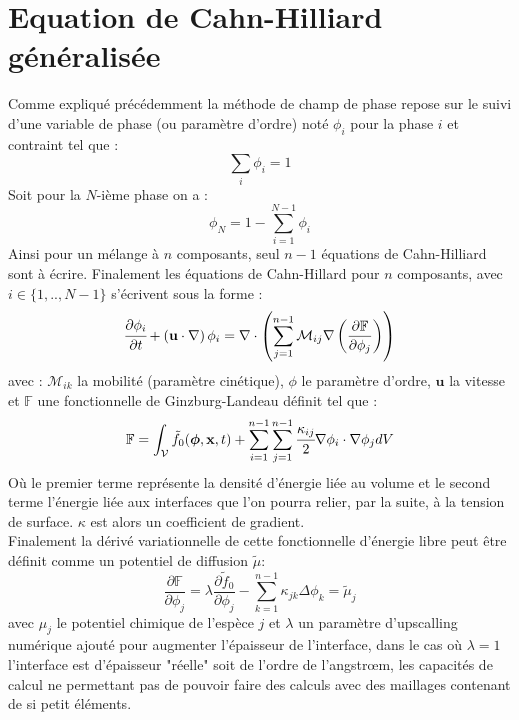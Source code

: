 \documentclass[a4paper,11pt,fleqn]{report}    %
\begin{document}
\section{Equation de Cahn-Hilliard généralisée}
Comme expliqué précédemment la méthode de champ de phase repose sur le suivi d'une variable de phase (ou paramètre d'ordre) noté $\phi_i$ pour la phase $i$ et contraint tel que : 
\begin{equation}
\sum_i \phi_i =1
\end{equation} 
Soit pour la $N$-ième phase on a :
\begin{equation}
\phi_N =1 - \sum_{i=1}^{N-1} \phi_i
\end{equation} 
Ainsi pour un mélange à $n$ composants, seul $n-1$ équations de Cahn-Hilliard sont à écrire.
Finalement les équations de Cahn-Hillard pour $n$ composants, avec $i\in \{1,..,N-1 \}$ s'écrivent sous la forme :
\begin{equation}
\cfrac{\partial \phi_i}{\partial t} + \left(\mathbf{u} \cdot \nabla\right) \phi_i=  \nabla \cdot \left(\sum_{j=1}^{n-1}{\mathcal{M}_{ij}} \nabla\left( \frac{\partial \mathbb{F}}{\partial \phi_j}\right) \right) 
\end{equation}
avec : $\mathcal{M}_{ik}$ la mobilité (paramètre cinétique),  $\phi$ le paramètre d'ordre, $\mathbf{u}$ la vitesse et $\mathbb{F}$ une fonctionnelle de Ginzburg-Landeau définit tel que : \\
 \begin{equation}
\mathbb{F} = \int_{\mathcal{V}}\tilde{f}_0(\bm{\phi},\mathbf{x},t)+ \sum_{i=1}^{n-1}\sum_{j=1}^{n-1}\cfrac{\kappa_{ij}}{2}\nabla \phi_i \cdot \nabla \phi_j dV
\end{equation}
Où le premier terme représente la densité d'énergie liée au volume et le second terme l'énergie liée aux interfaces que l'on pourra relier, par la suite, à la tension de surface. $\kappa$ est alors un coefficient de gradient. \\
Finalement la dérivé variationnelle de cette fonctionnelle d'énergie libre peut être définit comme un potentiel de diffusion $\tilde{\mu}$: 
\begin{equation}\label{eq_potentiel}
	\frac{\partial \mathbb{F}}{\partial \phi_j} =\lambda \frac{\partial \tilde{f}_0}{\partial \phi_j} -\sum_{k=1}^{n-1} \kappa_{jk} \Delta \phi_k = \tilde{\mu}_j
\end{equation}
avec $\mu_j$ le potentiel chimique de l'espèce $j$ et $\lambda$ un paramètre d'upscalling numérique ajouté pour augmenter l'épaisseur de l'interface, dans le cas où $\lambda=1$ l'interface est d'épaisseur "réelle" soit de l'ordre de l'angstr\oe m, les capacités de calcul ne permettant pas de pouvoir faire des calculs avec des maillages contenant de si petit éléments. \\
\end{document}
